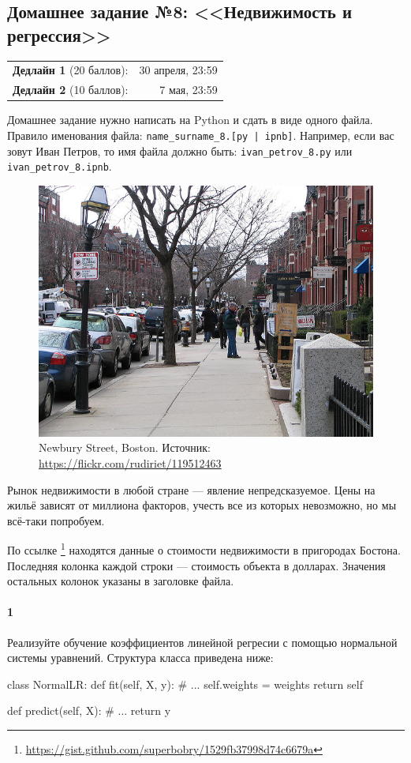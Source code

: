 \documentclass[a4paper,12pt]{article}
\begin{document}
\subsection*{Домашнее задание №8: <<Недвижимость и регрессия>>}

\begin{tabular}{@{}lr}
  \textbf{Дедлайн 1} (20 баллов): &  30 апреля, 23:59 \\
  \textbf{Дедлайн 2} (10 баллов): &  7 мая, 23:59 \\
\end{tabular}

Домашнее задание нужно написать на Python и сдать в виде одного файла.
Правило именования файла: \texttt{name\_surname\_8.[py | ipnb]}. Например, если
вас зовут Иван Петров, то имя файла должно быть: \texttt{ivan\_petrov\_8.py} или \texttt{ivan\_petrov\_8.ipnb}.

\makebox[\linewidth]{\hrulefill}

\begin{figure}[h!]
  \centering
  \includegraphics[width=.7\linewidth]{images/houses}
  \caption{Newbury Street, Boston. Источник: \url{https://flickr.com/rudiriet/119512463}}
\end{figure}

Рынок недвижимости в любой стране --- явление непредсказуемое. Цены на жильё
зависят от миллиона факторов, учесть все из которых невозможно, но мы всё-таки
попробуем.

По ссылке%
\footnote{\url{https://gist.github.com/superbobry/1529fb37998d74c6679a}}
находятся данные о стоимости недвижимости в пригородах Бостона. Последняя
колонка каждой строки --- стоимость объекта в долларах. Значения остальных
колонок указаны в заголовке файла.


\paragraph{1} Реализуйте обучение коэффициентов линейной регресии с помощью
нормальной системы уравнений. Структура класса приведена ниже:
\begin{python3}
class NormalLR:
    def fit(self, X, y):
        # ...
        self.weights = weights
        return self

    def predict(self, X):
        # ...
        return y
\end{python3}
\end{document}
